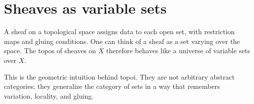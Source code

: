 \section{Sheaves as variable sets}

A sheaf on a topological space assigns data to each open set, with restriction maps and gluing conditions.  One can think of a sheaf as a set varying over the space.  The topos of sheaves on \(X\) therefore behaves like a universe of variable sets over \(X\).

This is the geometric intuition behind topoi.  They are not arbitrary abstract categories; they generalize the category of sets in a way that remembers variation, locality, and gluing.
